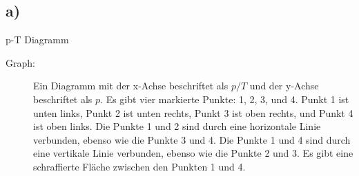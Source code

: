 

\subsection*{a)}
p-T Diagramm

\begin{description}
    \item[Graph:] Ein Diagramm mit der x-Achse beschriftet als $p/T$ und der y-Achse beschriftet als $p$. Es gibt vier markierte Punkte: 1, 2, 3, und 4. Punkt 1 ist unten links, Punkt 2 ist unten rechts, Punkt 3 ist oben rechts, und Punkt 4 ist oben links. Die Punkte 1 und 2 sind durch eine horizontale Linie verbunden, ebenso wie die Punkte 3 und 4. Die Punkte 1 und 4 sind durch eine vertikale Linie verbunden, ebenso wie die Punkte 2 und 3. Es gibt eine schraffierte Fläche zwischen den Punkten 1 und 4.
\end{description}